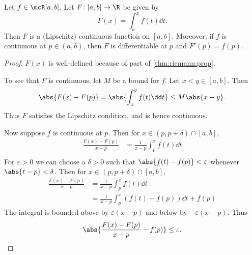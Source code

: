 \begin{exercise*}
    Let $f \in \mcR[a, b]$.
    Let $F\colon [a, b] \to \R$ be given by \[
        F(x) = \int_a^x f(t) \dd t.
    \] Then $F$ is a (Lipschitz) continuous function on $[a, b]$.
    Moreover, if $f$ is continuous at $p \in (a, b)$, then $F$ is
    differentiable at $p$ and $F'(p) = f(p)$.
\end{exercise*}
\begin{proof}
    $F(x)$ is well-defined because of part 
    of \cref{thm:riemann:prop}.

    To see that $F$ is continuous, let $M$ be a bound for $f$.
    Let $x < y \in [a, b]$.
    Then \[
        \abs{F(x) - F(p)}
            = \abs{\int_x^y f(t) \dd t}
            \le M \abs{x - y}.
    \] Thus $F$ satisfies the Lipschitz condition, and is hence continuous.

    Now suppose $f$ is continuous at $p$.
    Then for $x \in (p, p + \delta) \cap [a, b]$, \begin{align*}
        \frac{F(x) - F(p)}{x - p}
            &= \frac1{x - p} \int_p^x f(t) \dd t \\
    \end{align*}
    For $\varepsilon > 0$ we can choose a $\delta > 0$ such that
    $\abs{f(t) - f(p)} < \varepsilon$ whenever $\abs{t - p} < \delta$.
    Then for $x \in (p, p + \delta) \cap [a, b]$, \begin{align*}
        \frac{F(x) - F(p)}{x - p}
            &= \frac1{x - p} \int_p^x f(t) \dd t \\
            &= \frac1{x - p} \int_p^x (f(t) - f(p)) \dd t + f(p)
    \end{align*}
    The integral is bounded above by $\varepsilon (x - p)$ and below by
    $-\varepsilon (x - p)$.
    Thus \[
        \abs{\frac{F(x) - F(p)}{x - p} - f(p)} \le \varepsilon. \qedhere
    \]
\end{proof}

